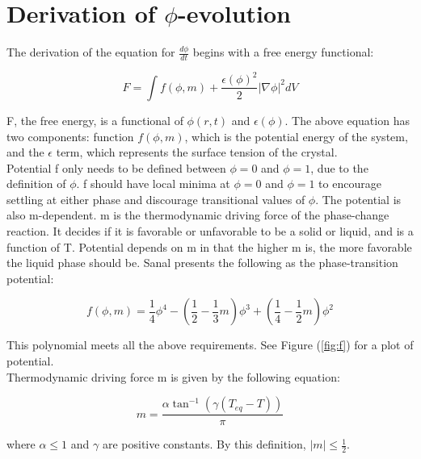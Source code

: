 \documentclass[10pt]{article} %
\begin{document}
\section{Derivation of $\phi$-evolution}
The derivation of the equation for $\frac{d\phi}{dt}$ begins with a free energy functional:

\begin{equation}
  F = \int f(\phi,m) + \frac{\epsilon(\phi)^2}{2}|\nabla\phi|^2 dV
\end{equation}

F, the free energy, is a functional of $\phi(r,t)$ and $\epsilon(\phi)$. The above equation has two components: function $f(\phi,m)$, which is the potential energy of the system, and the $\epsilon$ term, which represents the surface tension of the crystal.\\

Potential f only needs to be defined between $\phi=0$ and $\phi=1$, due to the definition of $\phi$. f should have local minima at $\phi=0$ and $\phi=1$ to encourage settling at either phase and discourage transitional values of $\phi$. The potential is also m-dependent. m is the thermodynamic driving force of the phase-change reaction. It decides if it is favorable or unfavorable to be a solid or liquid, and is a function of T. Potential depends on m in that the higher m is, the more favorable the liquid phase should be. Sanal presents the following as the phase-transition potential:

\begin{equation}
  f(\phi,m) = \frac{1}{4}\phi^4 - \left(\frac{1}{2} - \frac{1}{3}m\right)\phi^3 + \left(\frac{1}{4}-\frac{1}{2}m\right)\phi^2
\end{equation}

This polynomial meets all the above requirements. See Figure (\ref{fig:f}) for a plot of potential.\\

Thermodynamic driving force m is given by the following equation:

\begin{equation}
  m = \frac{\alpha \tan^{-1}\left(\gamma\left(T_{eq}-T\right)\right)}{\pi}
\end{equation}

where $\alpha \leq 1$ and $\gamma$ are positive constants. By this definition, $|m| \leq \frac{1}{2}$.
\end{document}
